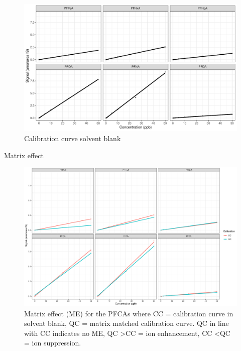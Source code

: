 \begin{figure}
    \centering
    \includegraphics[width=\textwidth]{R/figs/CC_all.pdf}
    \caption{Calibration curve solvent blank}
    \label{appfig:CC}
\end{figure}

Matrix effect

\begin{figure}
    \centering
    \includegraphics[width=\textwidth]{R/figs/CCQC_matrixeffect.pdf}
    \caption{Matrix effect (ME) for the PFCAs where CC = calibration curve in solvent blank, QC = matrix matched calibration curve. QC in line with CC indicates no ME, QC \textgreater CC = ion enhancement, CC \textless QC = ion suppression.}
    \label{appfig:ME}
\end{figure}